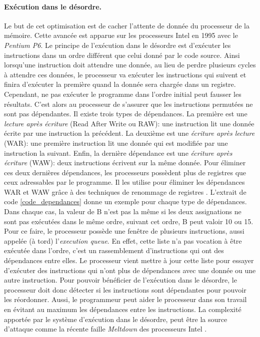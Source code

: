 \paragraph{Exécution dans le désordre.}\label{sec:out_of_order}
 

Le but de cet optimisation est de cacher l'attente de donnée du processeur de la mémoire. Cette avancée est apparue sur les processeurs Intel en 1995 avec le \textit{Pentium P6}. Le principe de l'exécution dans le désordre est d'exécuter les instructions dans un ordre différent que celui donné par le code source.  Ainsi lorsqu'une instruction doit attendre une donnée, au lieu de perdre plusieurs cycles à attendre ces données, le processeur va exécuter les instructions qui suivent et finira d'exécuter la première quand la donnée sera chargée dans un registre. 
Cependant, ne pas exécuter le programme dans l'ordre initial peut fausser les résultats. C'est alors au processeur de s'assurer que les instructions permutées ne sont pas dépendantes. Il existe trois types de dépendances. La première est une \textit{lecture après écriture} (Read After Write ou RAW): une instruction lit une donnée écrite par une instruction la précédent. La deuxième est une \textit{écriture après lecture} (WAR): une première instruction lit une donnée qui est modifiée par une instruction la suivant. Enfin, la dernière dépendance est une \textit{écriture après écriture} (WAW): deux instructions écrivent sur la même donnée. Pour éliminer ces deux dernières dépendances, les processeurs possèdent plus de registres que ceux adressables par le programme. Il les utilise pour éliminer les dépendances WAR et WAW grâce à des techniques de renommage de registres \cite{903248}. 
L'extrait de code \ref{code_dependances} donne un exemple pour chaque type de dépendances. Dans chaque cas, la valeur de B n'est pas la même si les deux assignations ne sont pas exécutées dans le même ordre, suivant cet ordre, B peut valoir 10 ou 15. Pour ce faire, le processeur possède une fenêtre de plusieurs instructions, aussi appelée (à tord) l'\textit{execution queue}. En effet, cette liste n'a pas vocation à être exécutée dans l'ordre, c'est un rassemblement d'instructions qui ont des dépendances entre elles. Le processeur vient mettre à jour cette liste pour essayer d'exécuter des instructions qui n'ont plus de dépendances avec une donnée ou une autre instruction.
Pour pouvoir bénéficier de l'exécution dans le désordre, le processeur doit donc détecter si les instructions sont dépendantes pour pouvoir les réordonner. Aussi, le programmeur peut aider le processeur dans son travail en évitant au maximum les dépendances entre les instructions. 
La complexité apportée par le système d'exécution dans le désordre, peut être la source d'attaque comme la récente faille \textit{Meltdown} des processeurs Intel \cite{DBLP:journals/corr/abs-1801-01207}.



